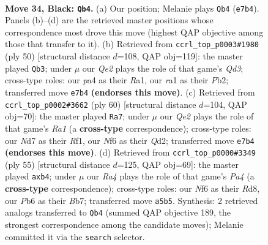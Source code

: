 \documentclass[11pt]{article}
\begin{document}
\clearpage

\begin{figure}[p]\centering
\begin{subfigure}{0.46\textwidth}\centering
\resizebox{\linewidth}{!}{%
\newchessgame
\chessboard[
  setfen={3r2k1/3nq1p1/1p3n2/r2p3p/P3p2N/2N3P1/2P2P1P/R2RQK2 b - - 3 34},
  showmover=false,
  pgfstyle=straightmove, color=movearrow, markmove={e7-b4}
]}
\caption{}
\end{subfigure}\hfill
\begin{subfigure}{0.46\textwidth}\centering
\resizebox{\linewidth}{!}{%
\newchessgame
\chessboard[
  setfen={2rqrnk1/5p2/1p3np1/p1pPp3/2N1P2P/R2QNP2/1P5P/R5K1 w - - 1 26},
  showmover=false,
  pgfstyle=straightmove, color=movearrow, markmove={d3-b3}
]}
\caption{}
\end{subfigure}
\\[4pt]
\begin{subfigure}{0.46\textwidth}\centering
\resizebox{\linewidth}{!}{%
\newchessgame
\chessboard[
  setfen={2rqr1k1/3n1p2/3p2p1/1p1P4/2p1Pn1p/4N2P/1P1Q1NPK/R4R2 w - - 0 31},
  showmover=false,
  pgfstyle=straightmove, color=movearrow, markmove={a1-a7}
]}
\caption{}
\end{subfigure}\hfill
\begin{subfigure}{0.46\textwidth}\centering
\resizebox{\linewidth}{!}{%
\newchessgame
\chessboard[
  setfen={3r2k1/1bq3pp/2n3r1/p2pp3/1P5P/P4NP1/3Q1PB1/R3R1K1 b - - 0 28},
  showmover=false,
  pgfstyle=straightmove, color=movearrow, markmove={a5-b4}
]}
\caption{}
\end{subfigure}
\caption{\textbf{Move 34, Black: \texttt{Qb4}.} (a) Our position; Melanie plays \texttt{Qb4} (\texttt{e7b4}). Panels (b)--(d) are the retrieved master positions whose correspondence most drove this move (highest QAP objective among those that transfer to it). (b) Retrieved from \texttt{ccrl\_top\_p0003\#1980} (ply 50) [structural distance $d$=108, QAP obj=119]: the master played \texttt{Qb3}; under $\mu$ our \emph{Qe2} plays the role of that game's \emph{Qd3}; cross-type roles: our \emph{p}a4 as their \emph{R}a1, our \emph{r}a1 as their \emph{P}b2; transferred move \texttt{e7b4} \textbf{(endorses this move)}. (c) Retrieved from \texttt{ccrl\_top\_p0002\#3662} (ply 60) [structural distance $d$=104, QAP obj=70]: the master played \texttt{Ra7}; under $\mu$ our \emph{Qe2} plays the role of that game's \emph{Ra1} (a \textbf{cross-type} correspondence); cross-type roles: our \emph{N}d7 as their \emph{R}f1, our \emph{N}f6 as their \emph{Q}d2; transferred move \texttt{e7b4} \textbf{(endorses this move)}. (d) Retrieved from \texttt{ccrl\_top\_p0000\#3349} (ply 55) [structural distance $d$=125, QAP obj=69]: the master played \texttt{axb4}; under $\mu$ our \emph{Ra4} plays the role of that game's \emph{Pa4} (a \textbf{cross-type} correspondence); cross-type roles: our \emph{N}f6 as their \emph{R}d8, our \emph{P}b6 as their \emph{B}b7; transferred move \texttt{a5b5}. Synthesis: 2 retrieved analogs transferred to \texttt{Qb4} (summed QAP objective 189, the strongest correspondence among the candidate moves); Melanie committed it via the \texttt{search} selector.}
\label{fig:thought-m67}
\end{figure}
\end{document}
